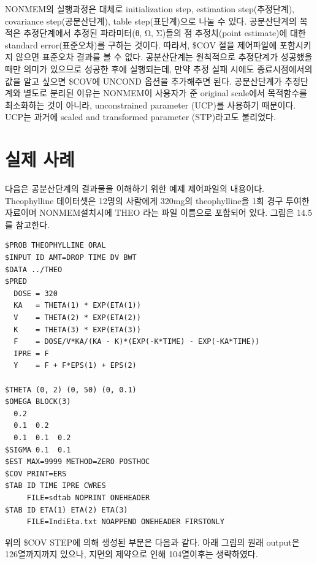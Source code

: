 \documentclass[
  10pt,
]{krantz}
\begin{document}
NONMEM의 실행과정은 대체로 initialization step, estimation step(추정단계), covariance step(공분산단계), table step(표단계)으로 나눌 수 있다. 공분산단계의 목적은 추정단계에서 추정된 파라미터(θ, Ω, Σ)들의 점 추정치(point estimate)에 대한 standard error(표준오차)를 구하는 것이다. 따라서, \$COV 절을 제어파일에 포함시키지 않으면 표준오차 결과를 볼 수 없다. 공분산단계는 원칙적으로 추정단계가 성공했을 때만 의미가 있으므로 성공한 후에 실행되는데, 만약 추정 실패 시에도 종료시점에서의 값을 알고 싶으면 \$COV에 UNCOND 옵션을 추가해주면 된다. 공분산단계가 추정단계와 별도로 분리된 이유는 NONMEM이 사용자가 준 original scale에서 목적함수를 최소화하는 것이 아니라, unconstrained parameter (UCP)를 사용하기 때문이다. UCP는 과거에 scaled and transformed parameter (STP)라고도 불리었다.


\hypertarget{uxc2e4uxc81c-uxc0acuxb840}{%
\section{실제 사례}\label{uxc2e4uxc81c-uxc0acuxb840}}

다음은 공분산단계의 결과물을 이해하기 위한 예제 제어파일의 내용이다. Theophylline 데이터셋은 12명의 사람에게 320mg의 theophylline을 1회 경구 투여한 자료이며 NONMEM설치시에 THEO 라는 파일 이름으로 포함되어 있다. 그림은 14.5를 참고한다.

\begin{verbatim}
$PROB THEOPHYLLINE ORAL
$INPUT ID AMT=DROP TIME DV BWT
$DATA ../THEO
$PRED
  DOSE = 320
  KA   = THETA(1) * EXP(ETA(1))
  V    = THETA(2) * EXP(ETA(2))
  K    = THETA(3) * EXP(ETA(3))
  F    = DOSE/V*KA/(KA - K)*(EXP(-K*TIME) - EXP(-KA*TIME))
  IPRE = F
  Y    = F + F*EPS(1) + EPS(2)

$THETA (0, 2) (0, 50) (0, 0.1)
$OMEGA BLOCK(3)
  0.2
  0.1  0.2
  0.1  0.1  0.2
$SIGMA 0.1  0.1
$EST MAX=9999 METHOD=ZERO POSTHOC
$COV PRINT=ERS
$TAB ID TIME IPRE CWRES
     FILE=sdtab NOPRINT ONEHEADER
$TAB ID ETA(1) ETA(2) ETA(3)
     FILE=IndiEta.txt NOAPPEND ONEHEADER FIRSTONLY
\end{verbatim}

위의 \$COV STEP에 의해 생성된 부분은 다음과 같다. 아래 그림의 원래 output은 126열까지까지 있으나, 지면의
제약으로 인해 104열이후는 생략하였다.
\end{document}
